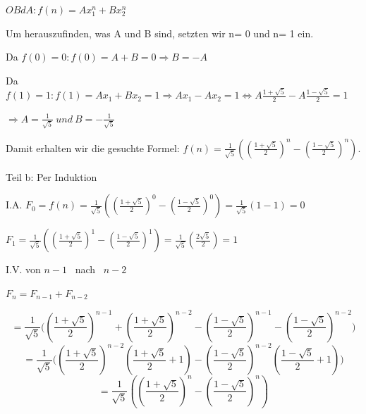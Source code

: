 \documentclass[10pt]{beamer}
\begin{document}
\begin{frame}

$OBdA: f(n)= Ax_1^n + Bx_2^n$

\vspace{0.2cm}
\noindent Um herauszufinden, was A und B sind, setzten wir n= 0 und n= 1 ein. 

\vspace{0.2cm}

Da  $f(0)= 0:  f(0)= A+B= 0  \Rightarrow B= -A$

Da $ f(1)= 1: f(1)= Ax_1+ Bx_2= 1 \Rightarrow Ax_1 - Ax_2= 1 \Leftrightarrow  A \frac{1 + \sqrt{5}}{2} -A \frac{1 - \sqrt{5}}{2}= 1 $

\vspace{0.15cm}

$\Rightarrow A= \frac{1}{\sqrt{5}} \ und  \ B= - \frac{1}{\sqrt{5}}$

\vspace{0.3cm}

\noindent Damit erhalten wir die gesuchte Formel: $f(n)= \frac{1}{\sqrt{5}} ((\frac{1 + \sqrt{5}}{2})^n - ( \frac{1 - \sqrt{5}}{2})^n)$.

    
\end{frame}

\begin{frame}{Teil b: Per Induktion}

I.A. $ F_0= f(n)= 
  \frac{1}{\sqrt{5}}((\frac{1 + \sqrt{5}}{2})^0 - ( \frac{1 - \sqrt{5}}{2})^0) = \frac{1}{\sqrt{5}} (1-1)= 0 $

\vspace{0.15cm}
    $F_1=  \frac{1}{\sqrt{5}} ((\frac{1 + \sqrt{5}}{2})^1 - ( \frac{1 - \sqrt{5}}{2})^1)= \frac{1}{\sqrt{5}} (\frac{2\sqrt{5}}{2}) = 1 $

\vspace{0.4cm}

\noindent I.V. von $n-1$ \ nach \ $ n-2$

$F_n= F_{n-1} + F_{n-2}$

\[
= \frac{1}{\sqrt{5}} \Bigg(
\left(\frac{1+\sqrt{5}}{2}\right)^{n-1}
+
\left(\frac{1+\sqrt{5}}{2}\right)^{n-2}
-
\left(\frac{1-\sqrt{5}}{2}\right)^{n-1}
-
\left(\frac{1-\sqrt{5}}{2}\right)^{n-2}
\Bigg)
\]
\[
= \frac{1}{\sqrt{5}} \Bigg(
\left(\frac{1+\sqrt{5}}{2}\right)^{n-2}
\left(\frac{1+\sqrt{5}}{2} + 1 \right)
-
\left(\frac{1-\sqrt{5}}{2}\right)^{n-2}
\left(\frac{1-\sqrt{5}}{2} + 1 \right)
\Bigg)
\]
\[
= \frac{1}{\sqrt{5}} \left(
\left(\frac{1+\sqrt{5}}{2}\right)^n
-
\left(\frac{1-\sqrt{5}}{2}\right)^n
\right)
\]
    
\end{frame}
\end{document}

